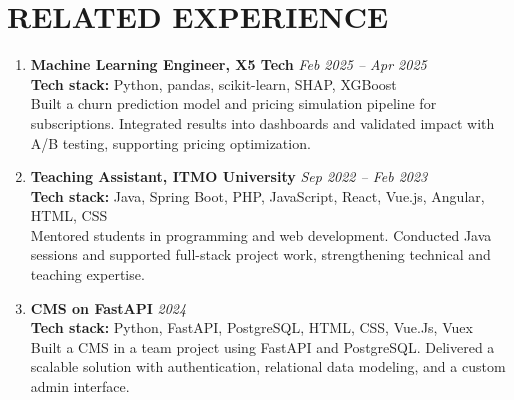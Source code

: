 \documentclass[11pt,a4paper]{moderncv}
\renewcommand\small{\fontsize{9}{10}\selectfont}
\begin{document}
\section{RELATED EXPERIENCE}

\begin{enumerate}[leftmargin=1em, itemsep=0.01em, labelsep=0.2em]
  \item \textbf{\color{darkblue} Machine Learning Engineer, X5 Tech} \hfill \textit{Feb 2025 -- Apr 2025} \\
  {\small \textbf{Tech stack:} Python, pandas, scikit-learn, SHAP, XGBoost}\\
  {\small Built a churn prediction model and pricing simulation pipeline for subscriptions. Integrated results into dashboards and validated impact with A/B testing, supporting pricing optimization.}

  \item \textbf{\color{darkblue} Teaching Assistant, ITMO University} \hfill \textit{Sep 2022 -- Feb 2023} \\
  {\small \textbf{Tech stack:} Java, Spring Boot, PHP, JavaScript, React, Vue.js, Angular, HTML, CSS \\
  Mentored students in programming and web development. Conducted Java sessions and supported full-stack project work, strengthening technical and teaching expertise.}

  \item \textbf{\color{darkblue} CMS on FastAPI} \hfill \textit{2024} \\
   {\small \textbf{Tech stack:} Python, FastAPI, PostgreSQL, HTML, CSS, Vue.Js, Vuex \\
  Built a CMS in a team project using FastAPI and PostgreSQL. Delivered a scalable solution with authentication, relational data modeling, and a custom admin interface.}
\end{enumerate}
\end{document}
